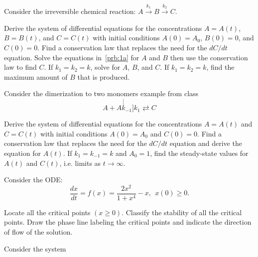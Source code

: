 \documentclass[
    number={7},
]{math486homework}
\begin{document}
\maketitle

\begin{problems}
    \problem Consider the irreversible chemical reaction: $A \stackrel{k_{1}}{\rightarrow} B \stackrel{k_{2}}{\rightarrow} C$.
    \begin{problems}
       \subproblem Derive the system of differential equations for the concentrations $A = A(t)$, $B = B(t)$, and $C = C(t)$ with initial conditions $A(0) = A_{0}$, $B(0) = 0$, and $C(0) = 0$. 
       \subproblem Find a conservation law that replaces the need for the $dC/dt$ equation. 
       \subproblem Solve the equations in~\ref{prb:1a} for $A$ and $B$ then use the conservation law to find $C$. 
       \subproblem If $k_{1} = k_{2} = k$, solve for $A$, $B$, and $C$. 
       \subproblem If $k_{1} = k_{2} = k$, find the maximum amount of $B$ that is produced. 
    \end{problems}
    \problem Consider the dimerization to two monomers example from class
    \[ A + A \stackrel[k_{-1}]{k_{1}}{\rightleftarrows} C \]
    \begin{problems}
       \subproblem Derive the system of differential equations for the concentrations $A = A(t)$ and $C = C(t)$ with initial conditions $A(0) = A_{0}$ and $C(0) = 0$. 
       \subproblem Find a conservation law that replaces the need for the $dC/dt$ equation and derive the equation for $A(t)$. 
       \subproblem If $k_{1} = k_{-1} = k$ and $A_{0} = 1$, find the steady-state values for $A(t)$ and $C(t)$, i.e. limits as $t \rightarrow \infty$. 
    \end{problems}
    \subproblem Consider the ODE:
    \[ \frac{dx}{dt} = f(x) = \frac{2x^{2}}{1 + x^{4}} - x,\ \ x(0) \geq 0. \]
    \begin{problems}
       \subproblem Locate all the critical points $(x \geq 0)$. 
       \subproblem Classify the stability of all the critical points. 
       \subproblem Draw the phase line labeling the critical points and indicate the direction of flow of the solution. 
    \end{problems}
    \problem Consider the system
    \begin{equation*}

\end{equation*}
\end{problems}
\end{document}
